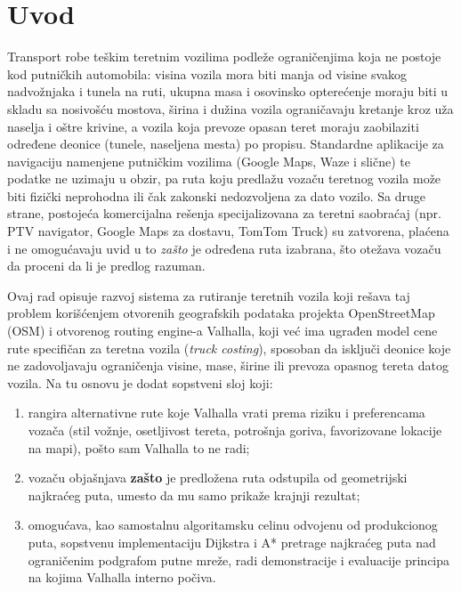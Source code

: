 \chapter{Uvod}

Transport robe teškim teretnim vozilima podleže ograničenjima koja ne postoje kod putničkih automobila: visina vozila mora biti manja od visine svakog nadvožnjaka i tunela na ruti, ukupna masa i osovinsko opterećenje moraju biti u skladu sa nosivošću mostova, širina i dužina vozila ograničavaju kretanje kroz uža naselja i oštre krivine, a vozila koja prevoze opasan teret moraju zaobilaziti određene deonice (tunele, naseljena mesta) po propisu. Standardne aplikacije za navigaciju namenjene putničkim vozilima (Google Maps, Waze i slične) te podatke ne uzimaju u obzir, pa ruta koju predlažu vozaču teretnog vozila može biti fizički neprohodna ili čak zakonski nedozvoljena za dato vozilo. Sa druge strane, postojeća komercijalna rešenja specijalizovana za teretni saobraćaj (npr. PTV navigator, Google Maps za dostavu, TomTom Truck) su zatvorena, plaćena i ne omogućavaju uvid u to \emph{zašto} je određena ruta izabrana, što otežava vozaču da proceni da li je predlog razuman.

Ovaj rad opisuje razvoj sistema za rutiranje teretnih vozila koji rešava taj problem korišćenjem otvorenih geografskih podataka projekta OpenStreetMap (OSM) i otvorenog routing engine-a Valhalla, koji već ima ugrađen model cene rute specifičan za teretna vozila (\emph{truck costing}), sposoban da isključi deonice koje ne zadovoljavaju ograničenja visine, mase, širine ili prevoza opasnog tereta datog vozila. Na tu osnovu je dodat sopstveni sloj koji:

\begin{enumerate}
\item rangira alternativne rute koje Valhalla vrati prema riziku i preferencama vozača (stil vožnje, osetljivost tereta, potrošnja goriva, favorizovane lokacije na mapi), pošto sam Valhalla to ne radi;
\item vozaču objašnjava \textbf{zašto} je predložena ruta odstupila od geometrijski najkraćeg puta, umesto da mu samo prikaže krajnji rezultat;
\item omogućava, kao samostalnu algoritamsku celinu odvojenu od produkcionog puta, sopstvenu implementaciju Dijkstra i A* pretrage najkraćeg puta nad ograničenim podgrafom putne mreže, radi demonstracije i evaluacije principa na kojima Valhalla interno počiva.
\end{enumerate}

